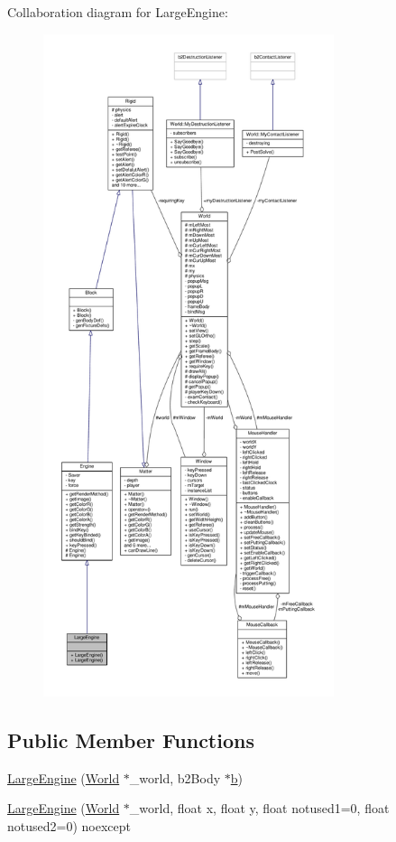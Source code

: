 Collaboration diagram for Large\+Engine\+:
\nopagebreak
\begin{figure}[H]
\begin{center}
\leavevmode
\includegraphics[height=550pt]{classLargeEngine__coll__graph}
\end{center}
\end{figure}
\subsection*{Public Member Functions}
\begin{DoxyCompactItemize}
\item 
\hyperlink{classLargeEngine_a756c59d574466007d596649bd3fe5504}{Large\+Engine} (\hyperlink{classWorld}{World} $\ast$\+\_\+world, b2\+Body $\ast$\hyperlink{image_8h_ab2d05693952610f937e5acb3c4a8fa1b}{b})
\item 
\hyperlink{classLargeEngine_a02b3d03941f0d1a554f0ce7e22938fd6}{Large\+Engine} (\hyperlink{classWorld}{World} $\ast$\+\_\+world, float x, float y, float notused1=0, float notused2=0) noexcept
\end{DoxyCompactItemize}
